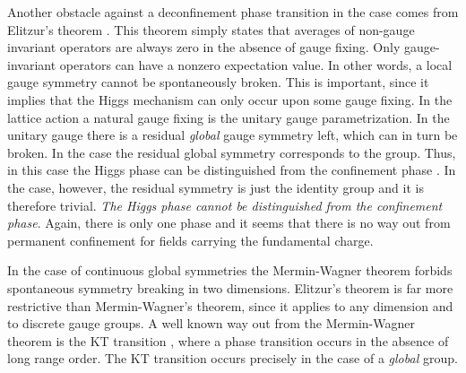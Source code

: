 \documentclass[a4paper,showpacs,preprintnumbers,amsmath,amssymb,prl,twocolumn]{revtex4}
\begin{document}
Another obstacle against a deconfinement phase transition in the \coordHE{} 
case comes from Elitzur's theorem \cite{Elitzur}. This theorem 
simply states that averages of non-gauge invariant operators 
are always zero in the absence of gauge fixing. Only gauge-invariant 
operators can have a nonzero expectation value. In other words, 
a local gauge symmetry cannot be spontaneously broken. This is  
important, since it implies that the Higgs mechanism can only occur upon 
some gauge fixing. In the lattice action a natural gauge 
fixing is the unitary gauge parametrization. In the unitary gauge 
there is a residual {\it global} gauge symmetry left, which can in 
turn be broken. In the \coordHE{} case the residual global symmetry 
corresponds to the \coordHE{} group. Thus, in this case the Higgs phase 
can be distinguished from the confinement phase \cite{FradShe}. In 
the \coordHE{} case, however, the residual symmetry is just the identity 
group and it is therefore trivial. {\it The Higgs phase cannot be 
distinguished from the confinement phase}. Again, there is only one 
phase and it seems that there is no way out from permanent confinement 
for fields carrying the fundamental charge.        

In the case of continuous global symmetries the Mermin-Wagner theorem 
\cite{MW} forbids spontaneous symmetry breaking in two dimensions. 
Elitzur's theorem is far more restrictive than Mermin-Wagner's theorem, 
since it applies to any dimension and to discrete gauge groups. A well 
known way out from the Mermin-Wagner theorem is the KT transition 
\cite{KT}, where a phase transition occurs in the absence of long range 
order. The KT transition occurs precisely in the case of a {\it global} 
\coordHE{} group. 
\end{document}
